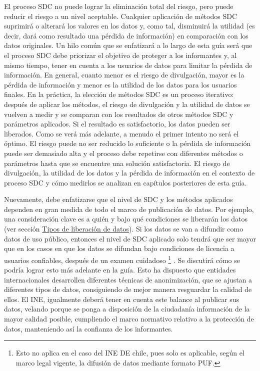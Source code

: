 \documentclass[
]{book}
\theoremstyle{definition}
\theoremstyle{definition}
\theoremstyle{definition}
\theoremstyle{definition}
\theoremstyle{remark}
\begin{document}
El proceso SDC no puede lograr la eliminación total del riesgo, pero puede reducir el riesgo a un nivel aceptable. Cualquier aplicación de métodos SDC suprimirá o alterará los valores en los datos y, como tal, disminuirá la utilidad (es decir, dará como resultado una pérdida de información) en comparación con los datos originales. Un hilo común que se enfatizará a lo largo de esta guía será que el proceso SDC debe priorizar el objetivo de proteger a los informantes y, al mismo tiempo, tener en cuenta a los usuarios de datos para limitar la pérdida de información. En general, cuanto menor es el riesgo de divulgación, mayor es la pérdida de información y menor es la utilidad de los datos para los usuarios finales.
En la práctica, la elección de métodos SDC es un proceso iterativo: después de aplicar los métodos, el riesgo de divulgación y la utilidad de datos se vuelven a medir y se comparan con los resultados de otros métodos SDC y parámetros aplicados. Si el resultado es satisfactorio, los datos pueden ser liberados. Como se verá más adelante, a menudo el primer intento no será el óptimo. El riesgo puede no ser reducido lo suficiente o la pérdida de información puede ser demasiado alta y el proceso debe repetirse con diferentes métodos o parámetros hasta que se encuentre una solución satisfactoria. El riesgo de divulgación, la utilidad de los datos y la pérdida de información en el contexto de proceso SDC y cómo medirlos se analizan en capítulos posteriores de esta guía.

Nuevamente, debe enfatizarse que el nivel de SDC y los métodos aplicados dependen en gran medida de todo el marco de publicación de datos. Por ejemplo, una consideración clave es a quién y bajo qué condiciones se liberarán los datos (ver sección \protect\hyperlink{tipos-de-liberaciuxf3n-de-datos}{Tipos de liberación de datos}). Si los datos se van a difundir como datos de uso público, entonces el nivel de SDC aplicado solo tendrá que ser mayor que en los casos en que los datos se difundan bajo condiciones de licencia a usuarios confiables, después de un examen cuidadoso \footnote{Esto no aplica en el caso del INE DE chile, pues solo es aplicable, según el marco legal vigente, la difusión de datos mediante formato PUF.} . Se discutirá cómo se podría lograr esto más adelante en la guía.
Esto ha dispuesto que entidades internacionales desarrollen diferentes técnicas de anonimización, que se ajustan a diferentes tipos de datos, consiguiendo de mejor manera resguardar la calidad de ellos.
El INE, igualmente deberá tener en cuenta este balance al publicar sus datos, velando porque se ponga a disposición de la ciudadanía información de la mayor calidad posible, cumpliendo el marco normativo relativo a la protección de datos, manteniendo así la confianza de los informantes.
\end{document}
